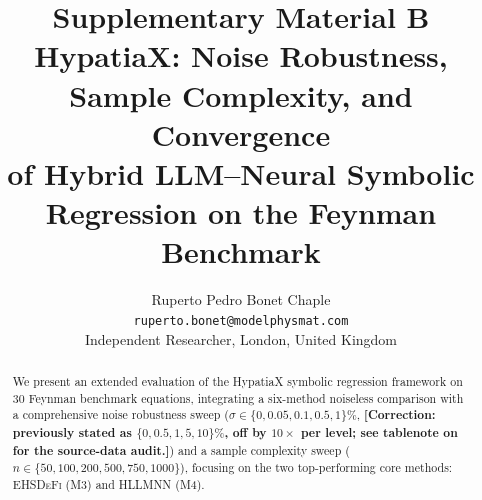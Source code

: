 \documentclass[twoside,11pt]{article}
\newcommand{\EHD}{\textsc{EHSDeFi}}
\newcommand{\HSL}{\textsc{HLLMNN}}
\begin{document}
\title{%
  Supplementary Material B\\[6pt]
  HypatiaX: Noise Robustness, Sample Complexity, and Convergence\\
  of Hybrid LLM--Neural Symbolic Regression on the Feynman Benchmark
}
\author{Ruperto Pedro Bonet Chaple\\
  \texttt{ruperto.bonet@modelphysmat.com}\\
  Independent Researcher, London, United Kingdom
}
\editor{}
\maketitle

\begin{abstract}
We present an extended evaluation of the HypatiaX symbolic regression
framework on 30 Feynman benchmark equations, integrating a six-method
noiseless comparison with a comprehensive noise robustness sweep
($\sigma \in \{0, 0.05, 0.1, 0.5, 1\}\%$, \textbf{[Correction: previously
stated as $\{0, 0.5, 1, 5, 10\}\%$, off by $10\times$ per level; see
tablenote on  for the source-data audit.]}) and a
sample complexity sweep
($n \in \{50, 100, 200, 500, 750, 1000\}$), focusing on the two
top-performing core methods: \EHD{} (M3) and \HSL{} (M4).


\end{abstract}
\end{document}
